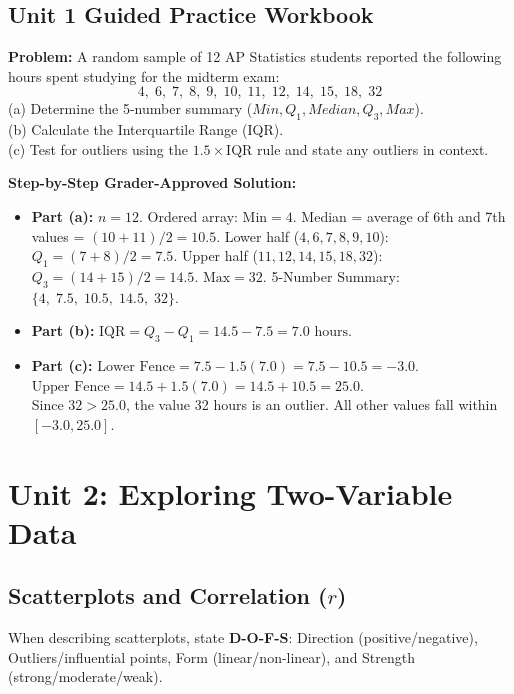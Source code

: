 \documentclass[11pt,oneside,openany]{book}
\begin{document}
\section{Unit 1 Guided Practice Workbook}
\begin{workbookbox}
\textbf{Problem:} A random sample of 12 AP Statistics students reported the following hours spent studying for the midterm exam:
\[ 4, \; 6, \; 7, \; 8, \; 9, \; 10, \; 11, \; 12, \; 14, \; 15, \; 18, \; 32 \]
(a) Determine the 5-number summary ($Min, Q_1, Median, Q_3, Max$).\\
(b) Calculate the Interquartile Range (IQR).\\
(c) Test for outliers using the $1.5 \times \text{IQR}$ rule and state any outliers in context.

\textbf{Step-by-Step Grader-Approved Solution:}
\begin{itemize}[leftmargin=1.2em]
  \item \textbf{Part (a):} $n = 12$. Ordered array:
  $\text{Min} = 4$. Median = average of 6th and 7th values = $(10 + 11)/2 = 10.5$.
  Lower half ($4, 6, 7, 8, 9, 10$): $Q_1 = (7 + 8)/2 = 7.5$.
  Upper half ($11, 12, 14, 15, 18, 32$): $Q_3 = (14 + 15)/2 = 14.5$.
  $\text{Max} = 32$.
  5-Number Summary: $\{4, \; 7.5, \; 10.5, \; 14.5, \; 32\}$.
  \item \textbf{Part (b):} $\text{IQR} = Q_3 - Q_1 = 14.5 - 7.5 = 7.0\text{ hours}$.
  \item \textbf{Part (c):}
  $\text{Lower Fence} = 7.5 - 1.5(7.0) = 7.5 - 10.5 = -3.0$.\\
  $\text{Upper Fence} = 14.5 + 1.5(7.0) = 14.5 + 10.5 = 25.0$.\\
  Since $32 > 25.0$, the value 32 hours is an outlier. All other values fall within $[-3.0, 25.0]$.
\end{itemize}
\end{workbookbox}

\chapter{Unit 2: Exploring Two-Variable Data}

\section{Scatterplots and Correlation ($r$)}
When describing scatterplots, state \textbf{D-O-F-S}: Direction (positive/negative), Outliers/influential points, Form (linear/non-linear), and Strength (strong/moderate/weak).
\end{document}
